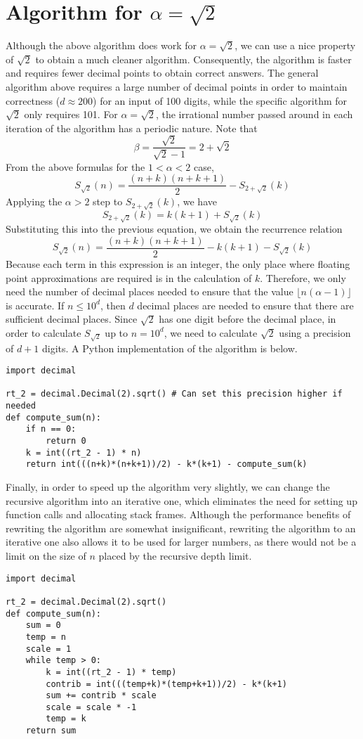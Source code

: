 \documentclass[oneside, 12pt]{article}
\begin{document}
\section*{Algorithm for $\alpha = \sqrt{2}$}
Although the above algorithm does work for $\alpha = \sqrt{2}$, we can use a nice property of $\sqrt{2}$ to obtain a much cleaner algorithm. Consequently, the algorithm is faster and requires fewer decimal points to obtain correct answers. The general algorithm above requires a large number of decimal points in order to maintain correctness ($d \approx 200$) for an input of 100 digits, while the specific algorithm for $\sqrt{2}$ only requires 101. For $\alpha = \sqrt{2}$, the irrational number passed around in each iteration of the algorithm has a periodic nature. Note that 
\[
\beta = \frac{\sqrt{2}}{\sqrt{2} - 1} = 2 + \sqrt{2}
\]
From the above formulas for the $1 < \alpha < 2$ case, 
\[
S_{\sqrt{2}}(n) = \frac{(n + k)(n + k + 1)}{2} - S_{2 + \sqrt{2}}(k)
\]
Applying the $\alpha > 2$ step to $S_{2 + \sqrt{2}}(k)$, we have 
\[
S_{2 + \sqrt{2}}(k) = k(k+1) + S_{\sqrt{2}}(k)
\]
Substituting this into the previous equation, we obtain the recurrence relation 
\[
S_{\sqrt{2}}(n) = \frac{(n+k)(n+k+1)}{2} - k(k+1) - S_{\sqrt{2}}(k)
\]
Because each term in this expression is an integer, the only place where floating point approximations are required is in the calculation of $k$. Therefore, we only need the number of decimal places needed to ensure that the value $\lfloor n (\alpha - 1) \rfloor$ is accurate. If $n \le 10^{d}$, then $d$ decimal places are needed to ensure that there are sufficient decimal places. Since $\sqrt{2}$ has one digit before the decimal place, in order to calculate $S_{\sqrt{2}}$ up to $n = 10^{d}$, we need to calculate $\sqrt{2}$ using a precision of $d+1$ digits. A Python implementation of the algorithm is below.
\begin{lstlisting}
import decimal

rt_2 = decimal.Decimal(2).sqrt() # Can set this precision higher if needed
def compute_sum(n):
	if n == 0:
		return 0
	k = int((rt_2 - 1) * n)
	return int(((n+k)*(n+k+1))/2) - k*(k+1) - compute_sum(k)
\end{lstlisting}
Finally, in order to speed up the algorithm very slightly, we can change the recursive algorithm into an iterative one, which eliminates the need for setting up function calls and allocating stack frames. Although the performance benefits of rewriting the algorithm are somewhat insignificant, rewriting the algorithm to an iterative one also allows it to be used for larger numbers, as there would not be a limit on the size of $n$ placed by the recursive depth limit. 
\begin{lstlisting}
import decimal

rt_2 = decimal.Decimal(2).sqrt()
def compute_sum(n):
	sum = 0
	temp = n
	scale = 1
	while temp > 0:
		k = int((rt_2 - 1) * temp)
		contrib = int(((temp+k)*(temp+k+1))/2) - k*(k+1)
		sum += contrib * scale
		scale = scale * -1
		temp = k
	return sum
\end{lstlisting}
\end{document}
